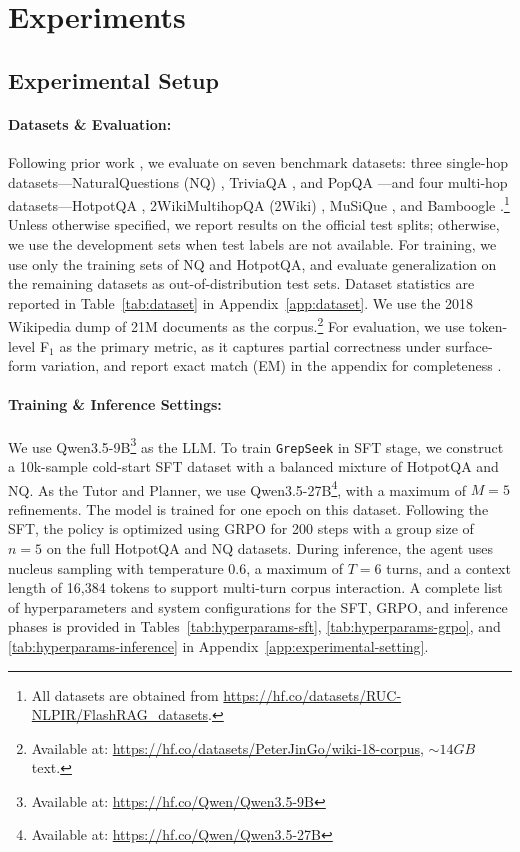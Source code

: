 \documentclass{llmxive}
\providecommand{\ourmethod}{\texttt{GrepSeek}\xspace}
\begin{document}
\section{Experiments}

\subsection{Experimental Setup}

\paragraph{Datasets \& Evaluation:}

Following prior work \citep{search-r1}, we evaluate on seven benchmark datasets: three single-hop datasets---NaturalQuestions (NQ) \citep{nq}, TriviaQA \citep{triviaqa}, and PopQA \citep{popqa}---and four multi-hop datasets---HotpotQA \citep{hotpotqa}, 2WikiMultihopQA (2Wiki) \citep{2wiki}, MuSiQue \citep{musique}, and Bamboogle \citep{bamboogle}.\footnote{All datasets are obtained from \url{https://hf.co/datasets/RUC-NLPIR/FlashRAG_datasets}.} Unless otherwise specified, we report results on the official test splits; otherwise, we use the development sets when test labels are not available. For training, we use only the training sets of NQ and HotpotQA, and evaluate generalization on the remaining datasets as out-of-distribution test sets. Dataset statistics are reported in Table~\ref{tab:dataset} in Appendix~\ref{app:dataset}. We use the 2018 Wikipedia dump \citep{karpukhin2020dense}  of 21M documents as the corpus.\footnote{Available at: \url{https://hf.co/datasets/PeterJinGo/wiki-18-corpus}, $\sim14GB$ text.} For evaluation, we use token-level F$_1$ as the primary metric, as it captures partial correctness under surface-form variation, and report exact match (EM) in the appendix for completeness \citep{rajpurkar-etal-2016-squad}.


\paragraph{Training \& Inference Settings:}

We use Qwen3.5-9B\footnote{Available at: \url{https://hf.co/Qwen/Qwen3.5-9B}} \citep{qwen3.5} as the LLM. To train \ourmethod in SFT stage, we construct a 10k-sample cold-start SFT dataset with a balanced mixture of HotpotQA and NQ. As the Tutor and Planner, we use Qwen3.5-27B\footnote{Available at: \url{https://hf.co/Qwen/Qwen3.5-27B}}, with a maximum of $M=5$ refinements. The model is trained for one epoch on this dataset. Following the SFT, the policy is optimized using GRPO \citep{grpo} for 200 steps with a group size of $n=5$ on the full HotpotQA and NQ datasets. During inference, the agent uses nucleus sampling \citep{Holtzman2020The} with temperature $0.6$, a maximum of $T=6$ turns, and a context length of 16{,}384 tokens to support multi-turn corpus interaction. A complete list of hyperparameters and system configurations for the SFT, GRPO, and inference phases is provided in Tables~\ref{tab:hyperparams-sft}, \ref{tab:hyperparams-grpo}, and \ref{tab:hyperparams-inference} in Appendix~\ref{app:experimental-setting}.
\end{document}
